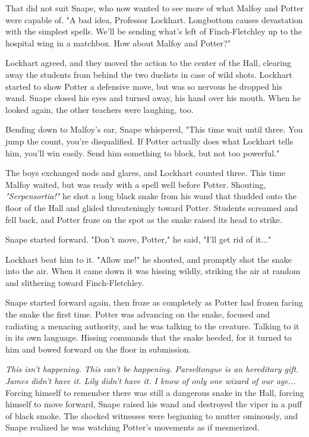 \documentclass[a4paper,11pt]{article}
\begin{document}
That did not suit Snape, who now wanted to see more of what Malfoy and Potter were capable of. "A bad idea, Professor Lockhart. Longbottom causes devastation with the simplest spells. We'll be sending what's left of Finch-Fletchley up to the hospital wing in a matchbox. How about Malfoy and Potter?"

Lockhart agreed, and they moved the action to the center of the Hall, clearing away the students from behind the two duelists in case of wild shots. Lockhart started to show Potter a defensive move, but was so nervous he dropped his wand. Snape closed his eyes and turned away, his hand over his mouth. When he looked again, the other teachers were laughing, too.

Bending down to Malfoy's ear, Snape whispered, "This time wait until three. You jump the count, you're disqualified. If Potter actually does what Lockhart tells him, you'll win easily. Send him something to block, but not too powerful."

The boys exchanged nods and glares, and Lockhart counted three. This time Malfoy waited, but was ready with a spell well before Potter. Shouting, \emph{"Serpensortia!"} he shot a long black snake from his wand that thudded onto the floor of the Hall and glided threateningly toward Potter. Students screamed and fell back, and Potter froze on the spot as the snake raised its head to strike.

Snape started forward. "Don't move, Potter," he said, "I'll get rid of it..."

Lockhart beat him to it. "Allow me!" he shouted, and promptly shot the snake into the air. When it came down it was hissing wildly, striking the air at random and slithering toward Finch-Fletchley.

Snape started forward again, then froze as completely as Potter had frozen facing the snake the first time. Potter was advancing on the snake, focused and radiating a menacing authority, and he was talking to the creature. Talking to it in its own language. Hissing commands that the snake heeded, for it turned to him and bowed forward on the floor in submission.

\emph{This isn't happening. This can't be happening. Parseltongue is an hereditary gift. James didn't have it. Lily didn't have it. I know of only one wizard of our age...} Forcing himself to remember there was still a dangerous snake in the Hall, forcing himself to move forward, Snape raised his wand and destroyed the viper in a puff of black smoke. The shocked witnesses were beginning to mutter ominously, and Snape realized he was watching Potter's movements as if mesmerized.
\end{document}
